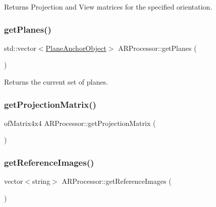 Returns Projection and View matrices for the specified orientation. 

\mbox{\label{class_a_r_processor_a7989d984ccedbb31b0299adfe1fb1ac4}} 
\subsubsection{\texorpdfstring{get\+Planes()}{getPlanes()}}
{\footnotesize\ttfamily std\+::vector$<$\mbox{\hyperlink{struct_a_r_objects_1_1_plane_anchor_object}{Plane\+Anchor\+Object}}$>$ A\+R\+Processor\+::get\+Planes (\begin{DoxyParamCaption}{ }\end{DoxyParamCaption})\hspace{0.3cm}{\ttfamily [inline]}}



Returns the current set of planes. 

\mbox{\label{class_a_r_processor_a0f7cf764c73a8fc3964be088156766ea}} 
\subsubsection{\texorpdfstring{get\+Projection\+Matrix()}{getProjectionMatrix()}}
{\footnotesize\ttfamily of\+Matrix4x4 A\+R\+Processor\+::get\+Projection\+Matrix (\begin{DoxyParamCaption}{ }\end{DoxyParamCaption})\hspace{0.3cm}{\ttfamily [inline]}}

\mbox{\label{class_a_r_processor_a7a44fddbb4da117c40aa762368d92c54}} 
\subsubsection{\texorpdfstring{get\+Reference\+Images()}{getReferenceImages()}}
{\footnotesize\ttfamily vector$<$string$>$ A\+R\+Processor\+::get\+Reference\+Images (\begin{DoxyParamCaption}{ }\end{DoxyParamCaption})}




